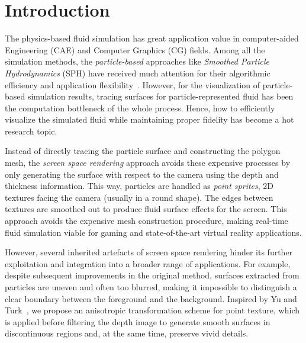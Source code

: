 \documentclass[times,twocolumn,final]{elsarticle}
\begin{document}
\linenumbers

\section{Introduction}
\label{sec1}


The physics-based fluid simulation has great application value in computer-aided Engineering (CAE) and Computer Graphics (CG) fields.
Among all the simulation methods, the \emph{particle-based} approaches like \emph{Smoothed Particle Hydrodynamics} (SPH) have received much attention for their algorithmic efficiency and application flexibility~\cite{Ihmsen14}. 
However, for the visualization of particle-based simulation results, tracing surfaces for particle-represented fluid has been the computation bottleneck of the whole process. Hence, how to efficiently visualize the simulated fluid while maintaining proper fidelity has become a hot research topic.

Instead of directly tracing the particle surface and constructing the polygon mesh, the \emph{screen space rendering} approach avoids these expensive processes by only generating the surface with respect to the camera using the depth and thickness information. This way, particles are handled as \emph{point sprites}, 2D textures facing the camera (usually in a round shape). The edges between textures are smoothed out to produce fluid surface effects for the screen\cite{ref:ref2}. This approach avoids the expensive mesh construction procedure, making real-time fluid simulation viable for gaming and state-of-the-art virtual reality applications\cite{ref:ref3}. 

However, several inherited artefacts of screen space rendering hinder its further exploitation and integration into a broader range of applications. For example, despite subsequent improvements in the original method, surfaces extracted from particles are uneven and often too blurred, making it impossible to distinguish a clear boundary between the foreground and the background. Inspired by Yu and Turk~\cite{yu2013reconstructing}, we propose an anisotropic transformation scheme for point texture, which is applied before filtering the depth image to generate smooth surfaces in discontinuous regions and, at the same time, preserve vivid details.
\end{document}
